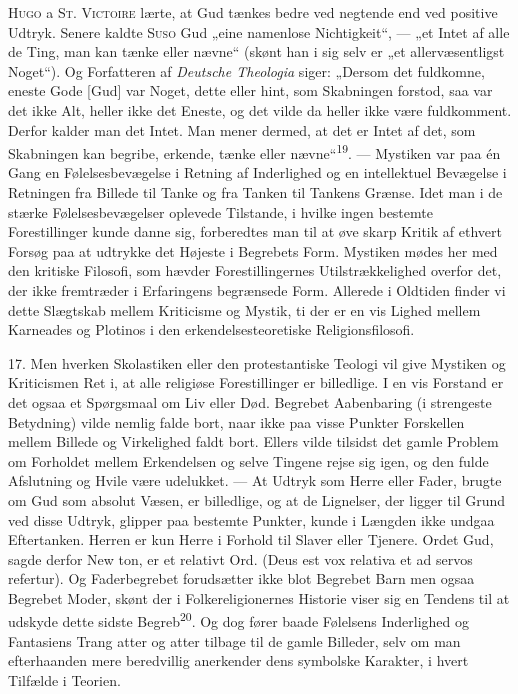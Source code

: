\documentclass[12pt,a4paper,openany]{book}
\newcommand{\opage}[1]{\marginnote{\footnotesize\textit{[#1]}}}
\begin{document}
\textsc{Hugo} a \textsc{St. Victoire} lærte, at Gud tænkes bedre ved
negtende end ved positive Udtryk. Senere kaldte \textsc{Suso} Gud „eine
namenlose Nichtigkeit“, --- „et Intet af alle de Ting, man kan tænke
eller nævne“ (skønt han i sig selv er „et allervæsentligst Noget“). Og
Forfatteren af \textit{Deutsche Theologia} siger: „Dersom det fuldkomne,
eneste Gode [Gud] var Noget, dette eller hint, som Skabningen forstod,
saa var det ikke Alt, heller ikke det Eneste, og det vilde da heller
ikke være fuldkomment. Derfor kalder man det Intet. Man mener dermed, at
det er Intet af det, som Skabningen kan begribe, erkende, tænke eller
nævne“\textsuperscript{19}. --- Mystiken var paa én Gang en
Følelsesbevægelse i Retning af Inderlighed og en intellektuel Bevægelse
i Retningen fra Billede til Tanke og fra Tanken til Tankens Grænse. Idet
man i de stærke Følelsesbevægelser oplevede Tilstande, i hvilke ingen
bestemte Forestillinger kunde danne sig, forberedtes man til at øve
skarp Kritik af ethvert Forsøg paa at udtrykke det Højeste i Begrebets
Form. Mystiken mødes her med den kritiske Filosofi, som hævder
Forestillingernes Utilstrækkelighed overfor det, der ikke fremtræder i
Erfaringens begrænsede Form. Allerede i Oldtiden finder vi dette
Slægtskab mellem Kriticisme og Mystik, ti der er en vis Lighed mellem
Karneades og Plotinos i den erkendelsesteoretiske Religionsfilosofi.

17. Men hverken Skolastiken eller den protestantiske Teologi vil give
Mystiken og Kriticismen Ret i, at alle religiøse Forestillinger er
billedlige. I en vis Forstand er det ogsaa et Spørgsmaal om Liv eller
Død. Begrebet Aabenbaring (i strengeste Betydning) vilde nemlig falde
bort, naar ikke paa visse Punkter Forskellen mellem Billede og
Virkelighed faldt bort. Ellers vilde tilsidst det gamle Problem om
Forholdet mellem Erkendelsen og selve Tingene rejse sig igen, og den
fulde Afslutning og Hvile være udelukket. --- At Udtryk som Herre eller
Fader, brugte om Gud som absolut Væsen, er billedlige, og at de
Lignelser, der ligger til Grund ved disse Udtryk, glipper paa bestemte
Punkter, kunde i Længden ikke undgaa Eftertanken. Herren er kun Herre i
Forhold til Slaver eller Tjenere. Ordet Gud, sagde derfor New%
\opage{44}ton, er et relativt Ord. (Deus est vox relativa et ad servos
refertur). Og Faderbegrebet forudsætter ikke blot Begrebet Barn men
ogsaa Begrebet Moder, skønt der i Folkereligionernes Historie viser sig
en Tendens til at udskyde dette sidste Begreb\textsuperscript{20}. Og
dog fører baade Følelsens Inderlighed og Fantasiens Trang atter og atter
tilbage til de gamle Billeder, selv om man efterhaanden mere beredvillig
anerkender dens symbolske Karakter, i hvert Tilfælde i Teorien.
\end{document}
